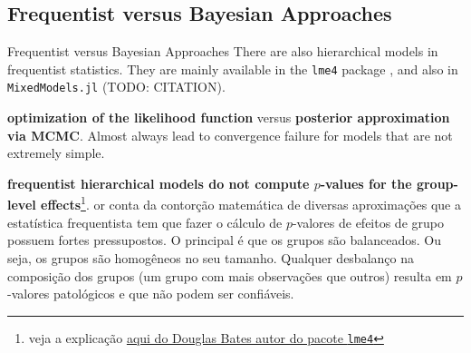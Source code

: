 \subsection{Frequentist versus Bayesian Approaches}
\begin{frame}{Frequentist versus Bayesian Approaches}
	There are also hierarchical models in frequentist statistics.
	They are mainly available in the \texttt{lme4} package \parencite{lme4},
	and also in \texttt{MixedModels.jl} (TODO: CITATION).
	\begin{vfilleditems}
		\item \textbf{optimization of the likelihood function} versus \textbf{posterior approximation via MCMC}.
		Almost always lead to convergence failure for models that are not extremely simple.
		\item \textbf{frequentist hierarchical models do not compute $p$-values for the group-level effects}\footnote{veja a explicação \href{https://stat.ethz.ch/pipermail/r-help/2006-May/094765.html}{aqui do Douglas Bates autor do pacote \texttt{lme4}}}.
		or conta da contorção matemática de diversas aproximações que a estatística
		frequentista tem que fazer o cálculo de $p$-valores de efeitos de
		grupo possuem fortes pressupostos. O principal é que os grupos são balanceados.
		Ou seja, os grupos são homogêneos no seu tamanho.
		Qualquer desbalanço na composição dos grupos (um grupo com mais observações que outros) resulta em
		$p$-valores patológicos e que não podem ser confiáveis.
	\end{vfilleditems}
\end{frame}



